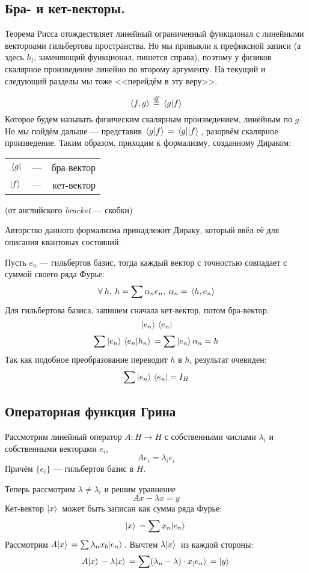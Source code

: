 \documentclass[12pt]{article}
\begin{document}
	\subsection*{Бра- и кет-векторы.}
	Теорема Рисса отождествляет линейный ограниченный функционал с линейными вектороами гильбертова пространства.
	Но мы привыкли к префиксной записи (а здесь $h_l$, заменяющий функционал, пишется справа), поэтому у физиков
	скалярное произведение линейно по второму аргументу. На текущий и следующий разделы мы тоже <<перейдём в эту веру>>.
	
	$$\, \langle f, g \rangle \, \overset{df}{=} \, \langle g | f \rangle \,$$
	Которое будем называть физическим скалярным произведением, линейным по $g$. Но мы пойдём дальше --- представив
	$\, \langle g | f \rangle \, = \, \langle g | | f \rangle \,$, разорвём скалярное произведение. Таким образом, приходим к формализму, 
	созданному Дираком: \\
	\begin{tabular}{l c r}
		$\, \langle g |$ & --- & бра-вектор \\
		$| f \rangle \,$ & --- & кет-вектор \\
	\end{tabular}
	(от английского \textit{bracket} --- скобки)
	
	Авторство данного формализма принадлежит Дираку, который ввёл её для описания квантовых состояний.
	
	Пусть $e_n$ --- гильбертов базис, тогда каждый вектор с точностью совпадает с суммой своего ряда Фурье:
	$$ \forall h,\: h = \sum \alpha_n e_n,\: \alpha_n = \scal{h}{e_n} $$
	Для гильбертова базиса, запишем сначала кет-вектор, потом бра-вектор:
	$$ | e_n \rangle \, \, \langle e_n | $$
	$$ \sum | e_n \rangle \, \, \langle e_n | h_n \rangle \, = \sum | e_n \rangle \, \alpha_n = h $$
	Так как подобное преобразование переводит $h$ в $h$, результат очевиден:
	$$ \sum | e_n \rangle \, \, \langle e_n | = I_H $$
	
	\subsection*{Операторная функция Грина}
	
	Рассмотрим линейный оператор $A : H \rightarrow H$ с собственными числами $\lambda_i$ и собственными векторами $e_i$,
	$$A e_i = \lambda_i e_i$$
	Причём $\{e_i\}$ --- гильбертов базис в $H$.
	
	Теперь рассмотрим $\lambda \neq \lambda_i$ и решим уравнение
	$$ Ax - \lambda x = y $$
	Кет-вектор $| x \rangle \,$ может быть записан как сумма ряда Фурье:
	$$ | x \rangle \, = \sum x_n | e_n \rangle \, $$
	Рассмотрим $A | x \rangle \, = \sum \lambda_n x_b | e_n \rangle \,$. Вычтем $\lambda | x \rangle \,$ из каждой стороны:
	\begin{equation} \label{ketEq}
		A| x \rangle \, - \lambda| x \rangle \, = \sum (\lambda_n - \lambda) \cdot x_ | e_n \rangle \, = | y \rangle \,
	\end{equation}
	
\end{document}
